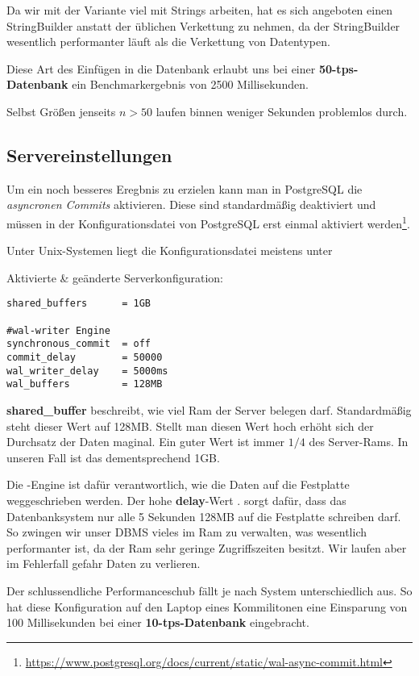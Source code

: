 Da wir mit der Variante viel mit Strings arbeiten, hat es sich angeboten einen
StringBuilder anstatt der üblichen Verkettung zu nehmen, da der StringBuilder
wesentlich performanter läuft als die Verkettung von Datentypen.

Diese Art des Einfügen in die Datenbank erlaubt uns bei einer
\textbf{50-tps-Datenbank} ein Benchmarkergebnis von 2500 Millisekunden.

Selbst Größen jenseits $n > 50$ laufen binnen weniger Sekunden problemlos durch.

\subsection{Servereinstellungen}

Um ein noch besseres Eregbnis zu erzielen kann man in PostgreSQL die
\textit{asyncronen Commits} aktivieren. Diese sind standardmäßig deaktiviert
und müssen in der Konfigurationsdatei von PostgreSQL erst einmal aktiviert
werden\footnote{\url{https://www.postgresql.org/docs/current/static/wal-async-commit.html}}.

Unter Unix-Systemen liegt die Konfigurationsdatei meistens unter \newline
{}

Aktivierte \& geänderte Serverkonfiguration:
\begin{lstlisting}[title={Veränderte Serverkonfiguration}]
shared_buffers		= 1GB

#wal-writer Engine
synchronous_commit	= off
commit_delay		= 50000
wal_writer_delay	= 5000ms
wal_buffers			= 128MB
\end{lstlisting}

\textbf{shared\_buffer} beschreibt, wie viel Ram der Server belegen darf.
Standardmäßig steht dieser Wert auf 128MB. Stellt man diesen Wert hoch erhöht
sich der Durchsatz der Daten maginal. Ein guter Wert ist immer $1/4$ des
Server-Rams. In unseren Fall ist das dementsprechend 1GB.

Die -Engine ist dafür verantwortlich, wie die Daten auf die
Festplatte weggeschrieben werden. Der hohe \textbf{delay}-Wert \zB. sorgt
dafür, dass das Datenbanksystem nur alle 5 Sekunden 128MB auf die Festplatte
schreiben darf. So zwingen wir unser DBMS vieles im Ram zu verwalten, was
wesentlich performanter ist, da der Ram sehr geringe Zugriffszeiten besitzt. Wir
laufen aber im Fehlerfall gefahr Daten zu verlieren.

Der schlussendliche Performanceschub fällt je nach System unterschiedlich aus.
So hat diese Konfiguration auf den Laptop eines Kommilitonen eine Einsparung von 100
Millisekunden bei einer \textbf{10-tps-Datenbank} eingebracht.

